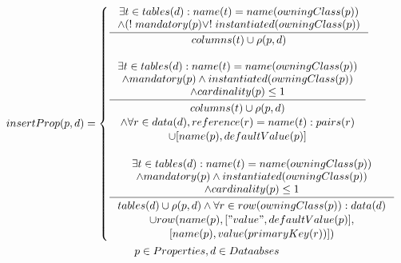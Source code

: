 \documentclass[11pt]{article}
\begin{document}
\begin{gather*}
insertProp(p, d) = \begin{cases}
\inference{ \exists t \in tables(d) : name(t) = name(owningClass(p)) \\ \wedge (!\;mandatory(p) \vee !\;instantiated(owningClass(p))}{ columns(t) \cup \rho(p,d)} 
\\ \\ 
\inference{ \exists t \in tables(d) : name(t) = name(owningClass(p)) \\ \wedge mandatory(p) \wedge instantiated(owningClass(p)) \\ \wedge cardinality(p) \leq 1}{\begin{gathered} columns(t) \cup 
 \rho(p,d) \\ \wedge \forall r \in data(d), reference(r) = name(t) : pairs(r) \\ \cup [name(p), defaultValue(p)]
\end{gathered}
} 
\\ \\
\inference{ \exists t \in tables(d) : name(t) = name(owningClass(p)) \\ \wedge mandatory(p) \wedge instantiated(owningClass(p)) \\ \wedge cardinality(p) \leq 1}{\begin{gathered}
tables(d) \cup  \rho(p,d) \wedge \forall r \in row(owningClass(p)) : data(d)\\ \cup row(name(p), ["value", defaultValue(p)], \\ [name(p), value(primaryKey(r))]) 
\end{gathered}
} 
\end{cases}\\
p \in Properties, d \in Dataabses
\end{gather*}
\end{document}
